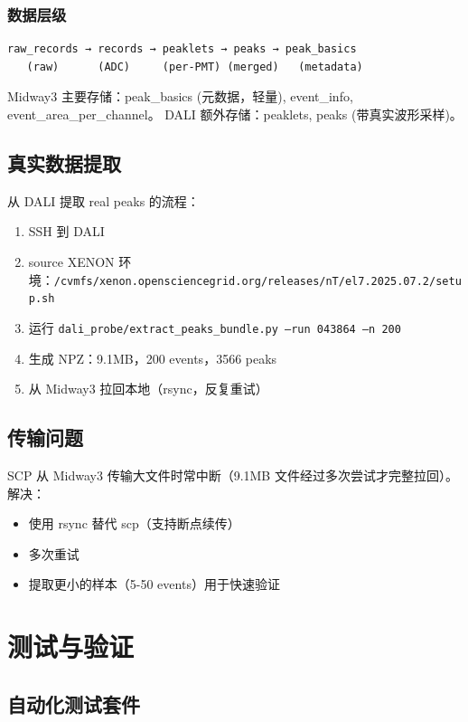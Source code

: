 \documentclass[12pt,a4paper]{article}
\begin{document}
\subsubsection{数据层级}

\begin{lstlisting}[language=text]
raw_records → records → peaklets → peaks → peak_basics
   (raw)      (ADC)     (per-PMT) (merged)   (metadata)
\end{lstlisting}

Midway3 主要存储：peak\_basics (元数据，轻量), event\_info, event\_area\_per\_channel。
DALI 额外存储：peaklets, peaks (带真实波形采样)。

\subsection{真实数据提取}

从 DALI 提取 real peaks 的流程：
\begin{enumerate}[itemsep=2pt]
\item SSH 到 DALI
\item source XENON 环境：\texttt{/cvmfs/xenon.opensciencegrid.org/releases/nT/el7.2025.07.2/setup.sh}
\item 运行 \texttt{dali\_probe/extract\_peaks\_bundle.py --run 043864 --n 200}
\item 生成 NPZ：9.1MB，200 events，3566 peaks
\item 从 Midway3 拉回本地（rsync，反复重试）
\end{enumerate}

\subsection{传输问题}

SCP 从 Midway3 传输大文件时常中断（9.1MB 文件经过多次尝试才完整拉回）。解决：
\begin{itemize}[itemsep=2pt]
\item 使用 rsync 替代 scp（支持断点续传）
\item 多次重试
\item 提取更小的样本（5-50 events）用于快速验证
\end{itemize}

\section{测试与验证}

\subsection{自动化测试套件}
\end{document}
